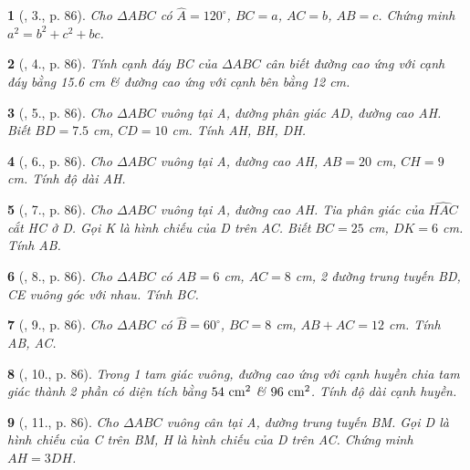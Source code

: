 \documentclass{article}
\newtheorem{baitoan}{}
\begin{document}
\begin{baitoan}[\cite{Binh_Toan_9_tap_1}, 3., p. 86]
	Cho $\Delta ABC$ có $\widehat{A} = 120^\circ$, $BC = a$, $AC = b$, $AB = c$. Chứng minh $a^2 = b^2 + c^2 + bc$.
\end{baitoan}

\begin{baitoan}[\cite{Binh_Toan_9_tap_1}, 4., p. 86]
	Tính cạnh đáy BC của $\Delta ABC$ cân biết đường cao ứng với cạnh đáy bằng {\rm15.6 cm} \& đường cao ứng với cạnh bên bằng {\rm12 cm}.
\end{baitoan}

\begin{baitoan}[\cite{Binh_Toan_9_tap_1}, 5., p. 86]
	Cho $\Delta ABC$ vuông tại A, đường phân giác AD, đường cao AH. Biết $BD = 7.5$ {\rm cm}, $CD = 10$ {\rm cm}. Tính AH, BH, DH.
\end{baitoan}

\begin{baitoan}[\cite{Binh_Toan_9_tap_1}, 6., p. 86]
	Cho $\Delta ABC$ vuông tại A, đường cao AH, $AB = 20$ {\rm cm}, $CH = 9$ {\rm cm}. Tính độ dài AH.
\end{baitoan}

\begin{baitoan}[\cite{Binh_Toan_9_tap_1}, 7., p. 86]
	Cho $\Delta ABC$ vuông tại A, đường cao AH. Tia phân giác của $\widehat{HAC}$ cắt HC ở D. Gọi K là hình chiếu của D trên AC. Biết $BC = 25$ {\rm cm}, $DK = 6$ {\rm cm}. Tính AB.
\end{baitoan}

\begin{baitoan}[\cite{Binh_Toan_9_tap_1}, 8., p. 86]
	Cho $\Delta ABC$ có $AB = 6$ {\rm cm}, $AC = 8$ {\rm cm}, 2 đường trung tuyến BD, CE vuông góc với nhau. Tính BC.
\end{baitoan}

\begin{baitoan}[\cite{Binh_Toan_9_tap_1}, 9., p. 86]
	Cho $\Delta ABC$ có $\widehat{B} = 60^\circ$, $BC = 8$ {\rm cm}, $AB + AC = 12$ {\rm cm}. Tính AB, AC.
\end{baitoan}

\begin{baitoan}[\cite{Binh_Toan_9_tap_1}, 10., p. 86]
	Trong 1 tam giác vuông, đường cao ứng với cạnh huyền chia tam giác thành 2 phần có diện tích bằng $\rm54\ cm^2$ \& $\rm96\ cm^2$. Tính độ dài cạnh huyền.
\end{baitoan}

\begin{baitoan}[\cite{Binh_Toan_9_tap_1}, 11., p. 86]
	Cho $\Delta ABC$ vuông cân tại A, đường trung tuyến BM. Gọi D là hình chiếu của C trên BM, H là hình chiếu của D trên AC. Chứng minh $AH = 3DH$.
\end{baitoan}
\end{document}
